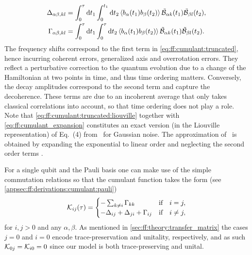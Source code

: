 \begin{align}
    \Delta_{\alpha\beta,kl} &= \int_0^\tau\dd{t_1}\int_0^{t_1}\dd{t_2}\expval{b_\alpha(t_1) b_\beta(t_2)}\tilde{\mathcal{B}}_{\alpha k}(t_1)\tilde{\mathcal{B}}_{\beta l}(t_2), \label{eq:ff:frequency_shift:time} \\
    \Gamma_{\alpha\beta,kl} &= \int_0^\tau\dd{t_1}\int_0^\tau\dd{t_2}\expval{b_\alpha(t_1) b_\beta(t_2)}\tilde{\mathcal{B}}_{\alpha k}(t_1)\tilde{\mathcal{B}}_{\beta l}(t_2).  \label{eq:ff:decay_amplitudes:time}
\end{align}
The frequency shifts \freqshifts correspond to the first term in \cref{eq:ff:cumulant:truncated}, hence incurring coherent errors, \ie generalized axis and overrotation errors.
They reflect a perturbative correction to the quantum evolution due to a change of the Hamiltonian at two points in time, and thus time ordering matters.
Conversely, the decay amplitudes \decayamps correspond to the second term and capture the decoherence.
These terms are due to an incoherent average that only takes classical correlations into account, so that time ordering does not play a role.
Note that \cref{eq:ff:cumulant:truncated:liouville} together with \cref{eq:ff:cumulant_expansion} constitutes an exact version (in the Liouville representation) of Eq.~(4) from~ for Gaussian noise.
The approximation of~ is obtained by expanding the exponential to linear order and neglecting the second order terms \freqshifts.

For a single qubit and \basis the Pauli basis one can make use of the simple commutation relations so that the cumulant function takes the form (see \cref{appsec:ff:derivations:cumulant:pauli})
\begin{equation}\label{eq:ff:cumulant:truncated:liouville:pauli}
    \cumulantfun_{ij}(\tau) = \begin{cases}
        - \sum_{k\neq i}\decayamps_{kk}                         &\qif* i = j,   \\
        - \freqshifts_{ij} + \freqshifts_{ji} + \decayamps_{ij} &\qif* i\neq j,
    \end{cases}
\end{equation}
for $i,j > 0$ and any $\alpha,\beta$.
As mentioned in \cref{sec:ff:theory:transfer_matrix} the cases $j = 0$ and $i = 0$ encode trace-preservation and unitality, respectively, and as such $\mathcal{K}_{0j} = \mathcal{K}_{i0} = 0$ since our model is both trace-preserving and unital.

